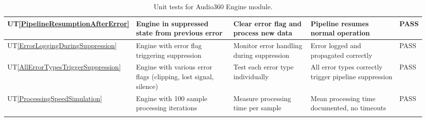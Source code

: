 \documentclass[12pt, titlepage]{article}
\newcommand{\utref}[1]{UT\ref{#1}}
\begin{document}
{\begin{longtable}{|p{0.8cm}|p{3.5cm}|p{3.5cm}|p{3.5cm}|p{1cm}|}
    \utref{PipelineResumptionAfterError} & Engine in suppressed state from
    previous error & Clear error flag and process new data & Pipeline resumes
    normal operation & PASS\\ \hline
    \utref{ErrorLoggingDuringSuppression} & Engine with error flag triggering
    suppression & Monitor error handling during suppression & Error logged and
    propagated correctly & PASS\\ \hline
    \utref{AllErrorTypesTriggerSuppression} & Engine with various error flags
    (clipping, lost signal, silence) & Test each error type individually & All
    error types correctly trigger pipeline suppression & PASS\\ \hline
    \utref{ProcessingSpeedSimulation} & Engine with 100 sample processing
    iterations & Measure processing time per sample & Mean processing time
    documented, no timeouts & PASS\\ \hline

    \caption{Unit tests for Audio360 Engine module.}
    \label{tab:unit_test_audio360_engine}
\end{longtable}
}

\end{document}
